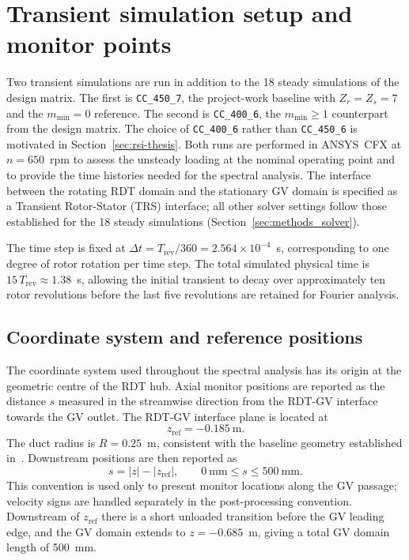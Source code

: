 \section{Transient simulation setup and monitor points}
\label{sec:monitor-setup}
 
Two transient simulations are run in addition to the 18 steady simulations of the design matrix. The first is \texttt{CC\_450\_7}, the project-work baseline with $Z_r=Z_s=7$ and the $m_{\min}=0$ reference. The second is \texttt{CC\_400\_6}, the $m_{\min}\geq 1$ counterpart from the design matrix. The choice of \texttt{CC\_400\_6} rather than \texttt{CC\_450\_6} is motivated in Section~\ref{sec:rsi-thesis}. Both runs are performed in ANSYS~CFX at $n = 650$~rpm to assess the unsteady loading at the nominal operating point and to provide the time histories needed for the spectral analysis. The interface between the rotating RDT domain and the stationary GV domain is specified as a Transient Rotor-Stator (TRS) interface; all other solver settings follow those established for the 18 steady simulations (Section~\ref{sec:methods_solver}).
 
The time step is fixed at $\Delta t = T_{\mathrm{rev}}/360 = 2.564\times 10^{-4}$~s, corresponding to one degree of rotor rotation per time step. The total simulated physical time is $15\,T_{\mathrm{rev}} \approx 1.38$~s, allowing the initial transient to decay over approximately ten rotor revolutions before the last five revolutions are retained for Fourier analysis.
 
\subsection{Coordinate system and reference positions}
\label{sec:coord-system}
 
The coordinate system used throughout the spectral analysis has its origin at the geometric centre of the RDT hub. Axial monitor positions are reported as the distance $s$ measured in the streamwise direction from the RDT-GV interface towards the GV outlet. The RDT-GV interface plane is located at
\begin{equation}
    z_{\mathrm{ref}} = -0.185~\mathrm{m}.
    \label{eq:zref}
\end{equation}
The duct radius is $R = 0.25$~m, consistent with the baseline geometry established in~\cite{Leonsen2025}. Downstream positions are then reported as
\begin{equation}
    s = |z| - |z_{\mathrm{ref}}|,
    \qquad 0~\mathrm{mm} \leq s \leq 500~\mathrm{mm}.
\end{equation}
This convention is used only to present monitor locations along the GV passage; velocity signs are handled separately in the post-processing convention. Downstream of $z_{\mathrm{ref}}$ there is a short unloaded transition before the GV leading edge, and the GV domain extends to $z = -0.685$~m, giving a total GV domain length of 500~mm.
 
